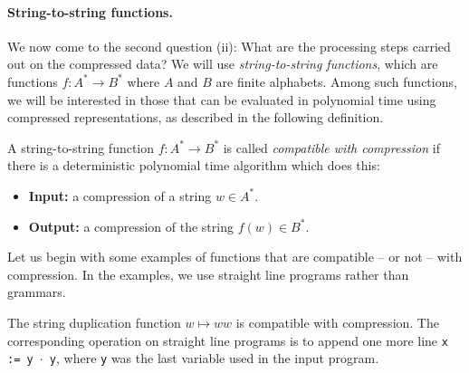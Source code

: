 \documentclass{article}
\begin{document}
\paragraph{String-to-string functions.}
We now come to the second question (ii): What are the processing steps carried out on the compressed data? We will use 
 \emph{string-to-string functions}, which are  functions $f : A^* \to B^*$ where $A$ and $B$ are finite alphabets. Among such functions, we will be interested in those that  can be evaluated in polynomial time  using compressed representations,  as described in the following definition.

\begin{definition}
    A string-to-string function $f : A^* \to B^*$ is called \emph{compatible with compression} if there is a deterministic polynomial time algorithm which does this: 
    \begin{itemize}
        \item \textbf{Input:} a compression of a string $w \in A^*$.
        \item \textbf{Output:} a compression of the string $f(w) \in B^*$.
    \end{itemize}
\end{definition}

Let us begin with some examples of functions that are compatible -- or not --  with compression. In the examples, we use straight line programs rather than grammars.

\begin{myexample}[Duplication]\label{ex:duplication}
    The string duplication function $w \mapsto ww$ is compatible with compression. The corresponding operation on straight line programs is to append one more line \texttt{x := y $\cdot$ y}, where \texttt{y} was the last variable used in the input program. 
\end{myexample}
\end{document}

